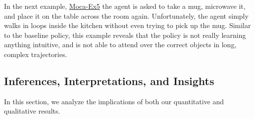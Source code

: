\documentclass[11pt,a4paper]{article}
\begin{document}
In the next example, \href{https://drive.google.com/file/d/1F400UjTNvMC2pw7HWOOEJ3va-XKUu0nE/view?usp=sharing}{Moca-Ex5} the agent is asked to take a mug, microwave it, and place it on the table across the room again. Unfortunately, the agent simply walks in loops inside the kitchen without even trying to pick up the mug. Similar to the baseline policy, this example reveals that the policy is not really learning anything intuitive, and is not able to attend over the correct objects in long, complex trajectories.

\subsection{Inferences, Interpretations, and Insights}
\label{ssec:insights}
In this section, we analyze the implications of both our quantitative and qualitative results.
\end{document}
